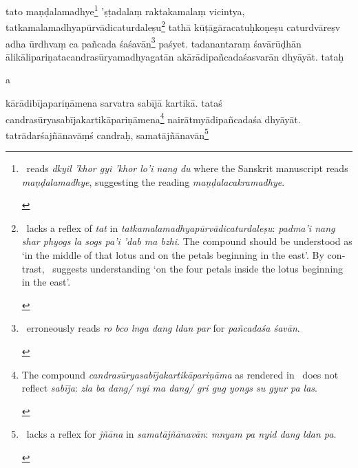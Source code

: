 \documentclass[naipra.tex]{subfiles}
\begin{document}
\begin{sanskrit}

\pstart
tato maṇḍalamadhye\footnote{
	\begin{english}%
		\TIB\ reads \emph{dkyil 'khor gyi 'khor lo'i nang du} where the Sanskrit manuscript reads \emph{maṇḍalamadhye}, suggesting the reading \emph{maṇḍalacakramadhye}.
	\end{english}
} 'ṣṭadalaṃ raktakamalaṃ vicintya, tatkamalamadhyapūrvādicaturdaleṣu\footnote{
	\begin{english}%
		\TIB\ lacks a reflex of \emph{tat} in \emph{tatkamalamadhyapūrvādicaturdaleṣu}: \emph{padma'i nang shar phyogs la sogs pa'i 'dab ma bzhi}.
		The compound should be understood as `in the middle of that lotus and on the petals beginning in the east'.
		By contrast, \TIB\ suggests understanding `on the four petals inside the lotus beginning in the east'.
	\end{english}
} tathā kūṭāgāracatuḥkoṇeṣu caturdvāreṣv adha ūrdhvaṃ ca pañcada śaśavān\footnote{
	\begin{english}%
		\TIB\ erroneously reads \emph{ro bco lnga dang ldan par} for \emph{pañcadaśa śavān}.
	\end{english}
} paśyet. 
tadanantaraṃ śavārūḍhān ālikālipariṇatacandrasūryamadhyagatān akārādipañcadaśasvarān dhyāyāt.
tataḥ \begin{mantra}a\end{mantra}\dsh kārādibījapariṇāmena sarvatra sabījā kartikā.
tataś candrasūryasabījakartikāpariṇāmena\footnote{
	\begin{english}%
		The compound \emph{candrasūryasabījakartikāpariṇāma} as rendered in \TIB\ does not reflect \emph{sabīja}: \emph{zla ba dang/ nyi ma dang/ gri gug yongs su gyur pa las}.
	\end{english}
} nairātmyādipañcadaśa dhyāyāt. 
tatrādarśajñānavāṃś candraḥ, samatājñānavān\footnote{
	\begin{english}%
		\TIB\ lacks a reflex for \emph{jñāna} in \emph{samatājñānavān}: \emph{mnyam pa nyid dang ldan pa}. 

\end{english}}
\end{sanskrit}
\end{document}
